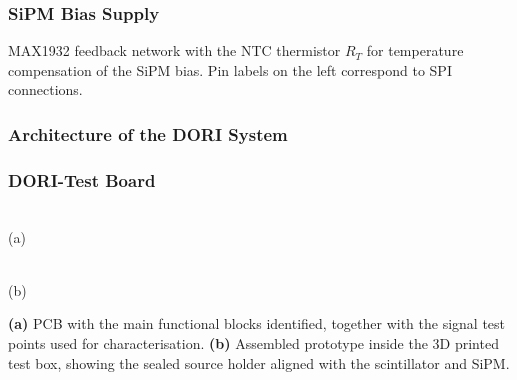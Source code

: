 \documentclass[aspectratio=169]{beamer}
\newcommand{\smallcap}[1]{{\footnotesize\color{black!70} #1\par}}
\begin{document}
\begin{frame}
  \frametitle{SiPM Bias Supply}
  \begin{center}
  \end{center}
  \smallcap{MAX1932 feedback network with the NTC thermistor $R_T$ for temperature compensation of the SiPM bias. Pin labels on the left correspond to SPI connections.}
\end{frame}

\begin{frame}
  \frametitle{Architecture of the DORI System}
  \begin{center}
  \end{center}
\end{frame}

\begin{frame}
  \frametitle{DORI-Test Board}
  \begin{center}
    \begin{minipage}[c]{0.52\linewidth}
      \centering
      \\[2pt]
      \footnotesize (a)
    \end{minipage}%
    \hfill%
    \begin{minipage}[c]{0.44\linewidth}
      \centering
      \\[2pt]
      \footnotesize (b)
    \end{minipage}
  \end{center}
  \smallcap{\textbf{(a)} PCB with the main functional blocks identified, together with the signal test points used for characterisation. \textbf{(b)} Assembled prototype inside the 3D printed test box, showing the sealed source holder aligned with the scintillator and SiPM.}
\end{frame}
\end{document}
